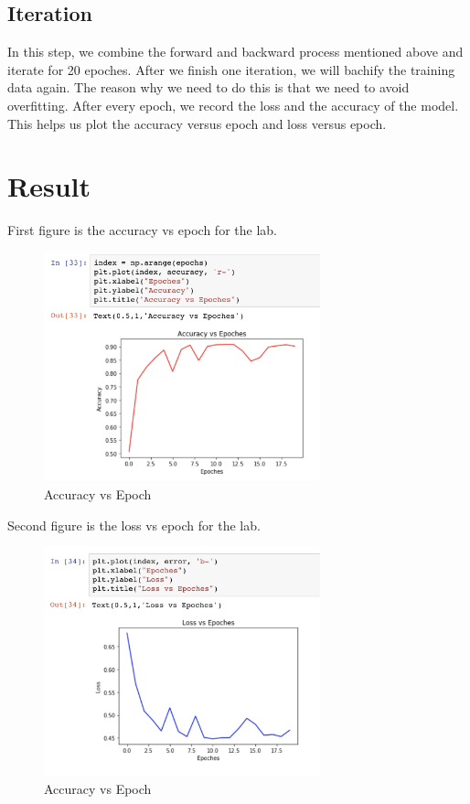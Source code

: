 \documentclass[12pt]{article}
\begin{document}
	\subsection*{Iteration}
		In this step, we combine the forward and backward process mentioned above and iterate for 20 epoches. After we finish one iteration, we will bachify the training data again. The reason why we need to do this is that we need to avoid overfitting. After every epoch, we record the loss and the accuracy of the model. This helps us plot the accuracy versus epoch and loss versus epoch.

	\section{Result}
		First figure is the accuracy vs epoch for the lab.
		\begin{figure}[ht]
			\begin{center}
				\includegraphics[width = 8cm]{acc}
			\end{center}
			\caption{Accuracy vs Epoch}
		\end{figure}
		\newline
		Second figure is the loss vs epoch for the lab.
		\begin{figure}[ht]
			\begin{center}
				\includegraphics[width = 8cm]{loss}
			\end{center}
			\caption{Accuracy vs Epoch}
		\end{figure}
\end{document}
